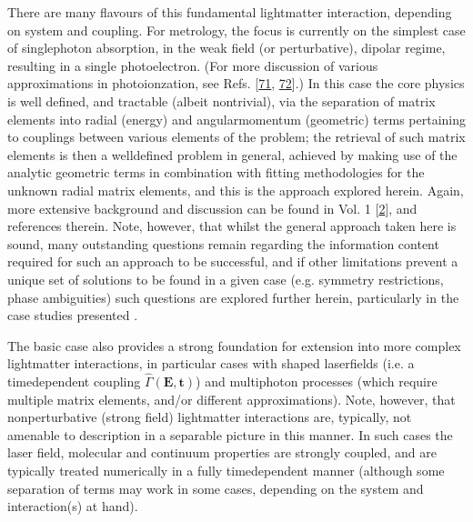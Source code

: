 \documentclass[letterpaper,table,10pt,english]{jupyterBook}
\begin{document}
\sphinxAtStartPar
There are many flavours of this fundamental light\sphinxhyphen{}matter interaction, depending on system and coupling. For metrology, the focus is currently on the simplest case of single\sphinxhyphen{}photon absorption, in the weak field (or perturbative), dipolar regime, resulting in a single photoelectron. (For more discussion of various approximations in photoionzation, see Refs. {[}\hyperlink{cite.backmatter/bibliography:id864}{71}, \hyperlink{cite.backmatter/bibliography:id863}{72}{]}.) In this case the core physics is well defined, and tractable (albeit non\sphinxhyphen{}trivial), via the separation of matrix elements into radial (energy) and angular\sphinxhyphen{}momentum (geometric) terms pertaining to couplings between various elements of the problem; the retrieval of such matrix elements is then a well\sphinxhyphen{}defined problem in general, achieved by making use of the analytic geometric terms in combination with fitting methodologies for the unknown radial matrix elements, and this is the approach explored herein. Again, more extensive background and discussion can be found in  Vol. 1 {[}\hyperlink{cite.backmatter/bibliography:id663}{2}{]}, and references therein. Note, however, that whilst the general approach taken here is sound, many outstanding questions remain regarding the information content required for such an approach to be successful, and if other limitations prevent a unique set of solutions to be found in a given case (e.g. symmetry restrictions, phase ambiguities) \sphinxhyphen{} such questions are explored further herein, particularly in the case studies presented {\hyperref[\detokenize{part2/extracting_matrix_elements_overview_270423:chpt-extracting-matrix-elements-overview}]{}}.

\sphinxAtStartPar
The basic case also provides a strong foundation for extension into more complex light\sphinxhyphen{}matter interactions, in particular cases with shaped laser\sphinxhyphen{}fields (i.e. a time\sphinxhyphen{}dependent coupling \(\hat{\Gamma}(\boldsymbol{\mathbf{E,t}})\)) and multi\sphinxhyphen{}photon processes (which require multiple matrix elements, and/or different approximations). Note, however, that non\sphinxhyphen{}perturbative (strong field) light\sphinxhyphen{}matter interactions are, typically, not amenable to description in a separable picture in this manner. In such cases the laser field, molecular and continuum properties are strongly coupled, and are typically treated numerically in a fully time\sphinxhyphen{}dependent manner (although some separation of terms may work in some cases, depending on the system and interaction(s) at hand).
\end{document}
